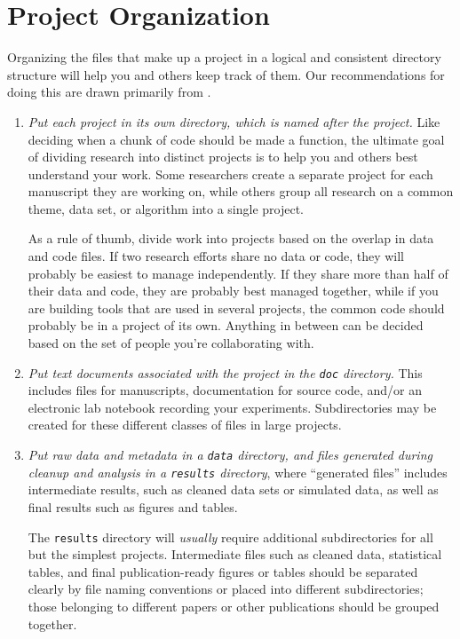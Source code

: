 \documentclass[10pt]{article}
\newcommand{\recommend}[1]{\textit{#1}}
\begin{document}
\section{Project Organization}\label{sec:project}

Organizing the files that make up a project in a logical and
consistent directory structure will help you and others keep track of
them.  Our recommendations for doing this are drawn primarily from
\cite{noble2009,gentzkow2014}.

\begin{enumerate}

\item
  \recommend{Put each project in its own directory, which is named
    after the project.}  Like deciding when a chunk of code should be
  made a function, the ultimate goal of dividing research into
  distinct projects is to help you and others best understand your
  work. Some researchers create a separate project for each manuscript
  they are working on, while others group all research on a common
  theme, data set, or algorithm into a single project.

  As a rule of thumb, divide work into projects based on the overlap
  in data and code files. If two research efforts share no data or
  code, they will probably be easiest to manage independently. If they
  share more than half of their data and code, they are probably best
  managed together, while if you are building tools that are used in
  several projects, the common code should probably be in a project of
  its own. Anything in between can be decided based on the set of
  people you're collaborating with.

\item
  \recommend{Put text documents associated with the project in the
    \texttt{doc} directory.} This includes files for manuscripts,
  documentation for source code, and/or an electronic lab notebook
  recording your experiments.  Subdirectories may be created for these
  different classes of files in large projects.

\item
  \recommend{Put raw data and metadata in a \texttt{data} directory,
    and files generated during cleanup and analysis in a
    \texttt{results} directory}, where ``generated files'' includes
  intermediate results, such as cleaned data sets or simulated data,
  as well as final results such as figures and tables.

  The \texttt{results} directory will \emph{usually}
  require additional subdirectories for all but the simplest
  projects. Intermediate files such as cleaned data, statistical
  tables, and final publication-ready figures or tables should be
  separated clearly by file naming conventions or placed into
  different subdirectories; those belonging to different papers or
  other publications should be grouped together.


\end{enumerate}
\end{document}

